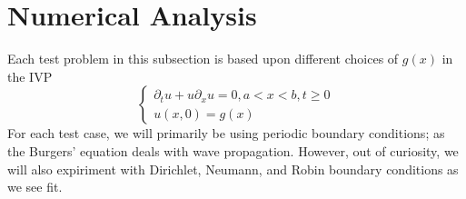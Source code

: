 \documentclass{myproject}
\begin{document}
\section{Numerical Analysis}
Each test problem in this subsection is based upon different choices of $g(x)$ in the IVP
	\begin{equation}
	    \begin{cases}
	      	\partial_t{u} + u\partial_x{u} = 0, a < x < b, t \geq 0 \\
			u(x, 0) = g(x)
	    \end{cases}
	\end{equation}
For each test case, we will primarily be using periodic boundary conditions; as the Burgers' equation deals with wave propagation. However, out of curiosity, we will also expiriment with Dirichlet, Neumann, and Robin boundary conditions as we see fit.
\end{document}
